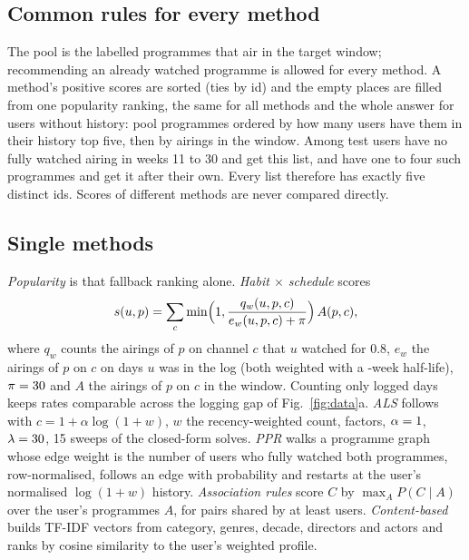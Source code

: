 \documentclass[conference]{IEEEtran}
\begin{document}
\subsection{Common rules for every method}
The pool is the labelled programmes that air in the target window; recommending an already watched programme is allowed for every method. A method's positive scores are sorted (ties by id) and the empty places are filled from one popularity ranking, the same for all methods and the whole answer for users without history: pool programmes ordered by how many users have them in their history top five, then by airings in the window. Among test users \nFallbackNone{} have no fully watched airing in weeks 11 to 30 and get this list, and \nFallbackFew{} have one to four such programmes and get it after their own. Every list therefore has exactly five distinct ids. Scores of different methods are never compared directly.

\subsection{Single methods}
\emph{Popularity} is that fallback ranking alone. \emph{Habit $\times$ schedule} scores
\[
s(u,p)=\sum_{c}\min\Bigl(1,\frac{q_w(u,p,c)}{e_w(u,p,c)+\pi}\Bigr)\,A(p,c),
\]
where $q_w$ counts the airings of $p$ on channel $c$ that $u$ watched for 0.8, $e_w$ the airings of $p$ on $c$ on days $u$ was in the log (both weighted with a \hsHalfLife-week half-life), $\pi=30$ and $A$ the airings of $p$ on $c$ in the window. Counting only logged days keeps rates comparable across the logging gap of Fig.~\ref{fig:data}a. \emph{ALS} follows~\cite{hu2008} with $c=1+\alpha\log(1+w)$, $w$ the recency-weighted count, \alsFactors{} factors, $\alpha=1$, $\lambda=30$, 15 sweeps of the closed-form solves. \emph{PPR} walks a programme graph whose edge weight is the number of users who fully watched both programmes, row-normalised, follows an edge with probability \pprAlpha{} and restarts at the user's normalised $\log(1+w)$ history. \emph{Association rules} score $C$ by $\max_{A}P(C\mid A)$ over the user's programmes $A$, for pairs shared by at least  users. \emph{Content-based} builds TF-IDF vectors from category, genres, decade, directors and actors and ranks by cosine similarity to the user's weighted profile.
\end{document}
